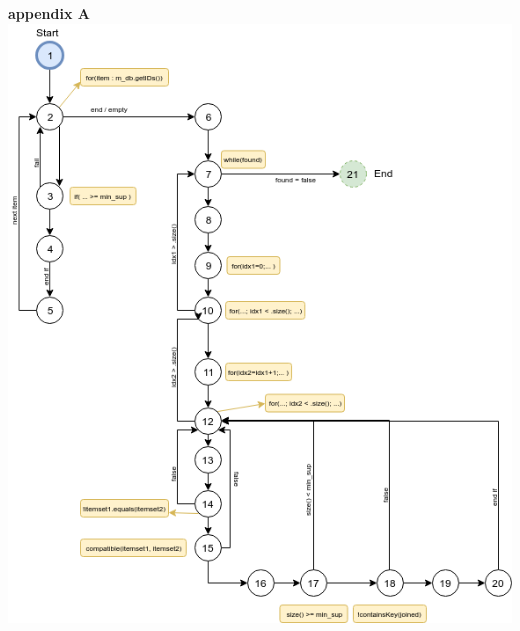 \documentclass{article}
\begin{document}
\newpage
\maketitle
\noindent
\textbf{appendix A}\newline
\newline
\includegraphics[width=\textwidth]{control_flow_graph}
\end{document}
